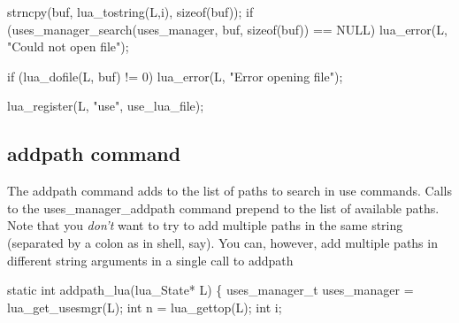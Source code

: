 \nwenddocs{}\endmoddef\nwstartdeflinemarkup{}\nwenddeflinemarkup
strncpy(buf, lua_tostring(L,i), sizeof(buf));
if (uses_manager_search(uses_manager, buf, sizeof(buf)) == NULL)
    lua_error(L, "Could not open file");
\nwendcode{}\nwdocspar

\nwenddocs{}\endmoddef\nwstartdeflinemarkup{}\nwenddeflinemarkup
if (lua_dofile(L, buf) != 0)
    lua_error(L, "Error opening file");
\nwendcode{}\nwdocspar

\nwenddocs{}\endmoddef\nwstartdeflinemarkup{}\nwenddeflinemarkup
lua_register(L, "use", use_lua_file);
\nwendcode{}\nwdocspar


\subsection{{\Tt{}addpath\nwendquote} command}

The {\Tt{}addpath\nwendquote} command adds to the list of paths to search in
{\Tt{}use\nwendquote} commands.  Calls to the {\Tt{}uses{\_}manager{\_}addpath\nwendquote} command
prepend to the list of available paths.  Note that you \emph{don't}
want to try to add multiple paths in the same string (separated by
a colon as in shell, say).  You can, however, add multiple paths
in different string arguments in a single call to {\Tt{}addpath\nwendquote}

\nwenddocs{}\plusendmoddef\nwstartdeflinemarkup{}\nwenddeflinemarkup
static int addpath_lua(lua_State* L)
\{
    uses_manager_t uses_manager = lua_get_usesmgr(L);
    int n = lua_gettop(L);
    int i;


